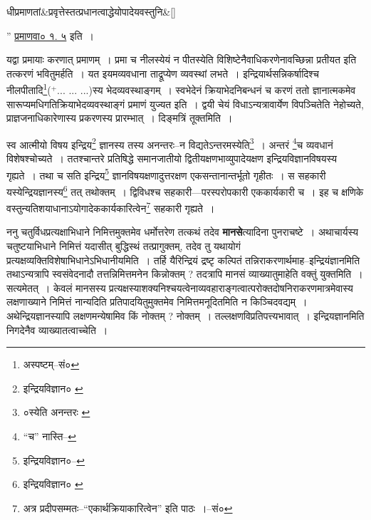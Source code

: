 \documentclass[article,12pt,a4paper]{memoir}
\newcommand{\add}[1]{($^{+}$#1)}
\begin{document}
	    
	    \stanza[\smallbreak]
	धीप्रमाणतां&प्रवृत्तेस्तत्प्रधानत्वाद्धेयोपादेयवस्तुनि\&[\smallbreak]


	
	    \pstart
	  ” \href{http://http://sarit.indology.info/?cref=pv.1.5}{प्रमाणवा० १. ५} इति ।
	\pend
      

	  \pstart यद्वा प्रमायाः करणात् प्रमाणम् । प्रमा च नीलस्येयं न पीतस्येति विशिष्टेनैवाधिकरणेनावच्छिन्ना प्रतीयत इति तत्करणं भवितुमर्हति । यत इयमव्यवधाना ताद्रूप्येण व्यवस्थां लभते । इन्द्रियार्थसन्निकर्षादिश्च नीलपीतादि\footnote{अस्पष्टम्--सं०}\add{... ... ...}स्य भेदव्यवस्थाङ्गम् । स्वभेदेनं क्रियाभेदनिबन्धनं च करणं ततो ज्ञानात्मकमेव सारूप्यमधिगतिक्रियाभेदव्यवस्थाङ्गं प्रमाणं युज्यत इति । द्वयी चेयं विधाऽन्यत्रावार्येण विपञ्चितेति नेहोच्यते, प्राज्ञजनाधिकारेणास्य प्रकरणस्य प्रारम्भात् । दिङ्मत्रिं तूक्तमिति ।
	\pend
      \leavevmode{}
	  \bigskip
	  \begingroup
	

	  \pstart स्व आत्मीयो विषय इन्द्रिय\footnote{इन्द्रियविज्ञान० \cite{dp-msB}} ज्ञानस्य तस्य अनन्तरः--न विद्यतेऽन्तरमस्येति\footnote{०स्येति अनन्तरः \cite{dp-msB} \cite{dp-msD}} । अन्तरं \footnote{“च” नास्ति--\cite{dp-msC}}च व्यवधानं विशेषश्चोच्यते । ततश्चान्तरे प्रतिषिद्धे समानजातीयो द्वितीयक्षणभाव्युपादेयक्षण इन्द्रियविज्ञानविषयस्य गृह्यते । तथा च सति इन्द्रिय\footnote{इन्द्रियविज्ञान०--\cite{dp-msC}} ज्ञानविषयक्षणादुत्तरक्षण एकसन्तानान्तर्भूतो गृहीतः । स सहकारी यस्येन्द्रियज्ञानस्य\footnote{इन्द्रियविज्ञान० \cite{dp-msA} \cite{dp-msB} \cite{dp-msD} \cite{dp-edP} \cite{dp-edH} \cite{dp-edE} \cite{dp-edN}} तत् तथोक्तम् । द्विविधश्च सहकारी—परस्परोपकारी एककार्यकारी च । इह च क्षणिके वस्तुन्यतिशयाधानाऽयोगादेककार्यकारित्वेन\footnote{अत्र प्रदीपसम्मतः--“एकार्थक्रियाकारित्वेन” इति पाठः ।--सं०} सहकारी गृह्यते ।
	\pend
      
	  \endgroup
	

	  \pstart ननु चतुर्विधप्रत्यक्षाभिधाने निमित्तमुक्तमेव धर्मोत्तरेण तत्कथं तदेव \textbf{मानसे}त्यादिना पुनराचष्टे । अथाचार्यस्य चतुष्टयाभिधाने निमित्तं यदासीत् बुद्धिस्थं तत्प्रागुक्तम्, तदेव तु यथायोगं प्रत्यक्षव्यक्तिविशेषाभिधानेऽभिधानीयमिति । तर्हि यैरिन्द्रियं द्रष्टृ कल्पितं तन्निराकरणार्थमाह--इन्द्रियंज्ञानमिति तथाऽन्यत्रापि स्वसंवेदनादौ तत्तन्निमित्तमनेन किन्नोक्तम् ? तदत्रापि मानसं व्याख्यातुमाहेति वक्तुं युक्तमिति । सत्यमेतत् । केवलं मानसस्य प्रत्यक्षस्याशक्यनिश्चयत्वेनाव्यवहाराङ्गत्वात्परोक्तदोषनिराकरणमात्रमेवास्य लक्षणाख्याने निमित्तं नान्यदिति प्रतिपादयितुमुक्तमेव निमित्तमनूदितमिति न किञ्चिदवद्यम् । अथेन्द्रियज्ञानस्यापि लक्षण\leavevmode{}मन्येषामिव किं नोक्तम् ? नोक्तम् । तल्लक्षणविप्रतिपत्त्यभावात् । इन्द्रियज्ञानमिति निगदेनैव व्याख्यातत्वाच्चेति ।
	\pend
      
\end{document}
